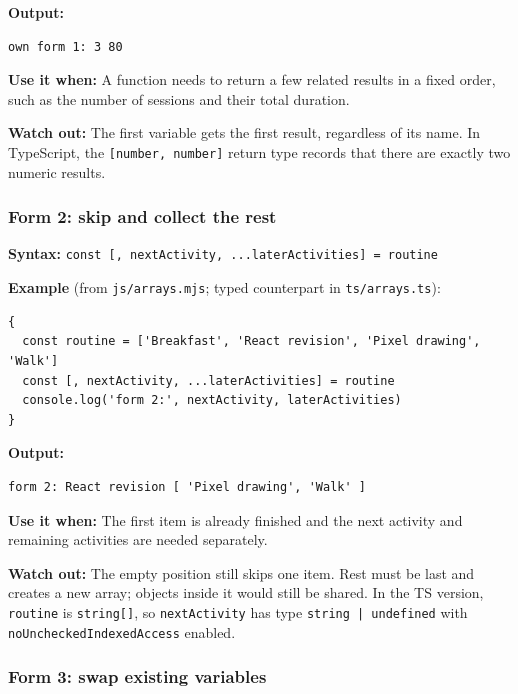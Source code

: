\documentclass[
  11pt,
]{article}
\newcommand{\passthrough}[1]{#1}
\begin{document}
\textbf{Output:}

\begin{lstlisting}
own form 1: 3 80
\end{lstlisting}

\textbf{Use it when:} A function needs to return a few related results
in a fixed order, such as the number of sessions and their total
duration.

\textbf{Watch out:} The first variable gets the first result, regardless
of its name. In TypeScript, the
\passthrough{\lstinline![number, number]!} return type records that
there are exactly two numeric results.

\subsubsection{Form 2: skip and collect the
rest}\label{form-2-skip-and-collect-the-rest}

\textbf{Syntax:}
\passthrough{\lstinline!const [, nextActivity, ...laterActivities] = routine!}

\textbf{Example} (from \passthrough{\lstinline!js/arrays.mjs!}; typed
counterpart in \passthrough{\lstinline!ts/arrays.ts!}):

\begin{lstlisting}
{
  const routine = ['Breakfast', 'React revision', 'Pixel drawing', 'Walk']
  const [, nextActivity, ...laterActivities] = routine
  console.log('form 2:', nextActivity, laterActivities)
}
\end{lstlisting}

\textbf{Output:}

\begin{lstlisting}
form 2: React revision [ 'Pixel drawing', 'Walk' ]
\end{lstlisting}

\textbf{Use it when:} The first item is already finished and the next
activity and remaining activities are needed separately.

\textbf{Watch out:} The empty position still skips one item. Rest must
be last and creates a new array; objects inside it would still be
shared. In the TS version, \passthrough{\lstinline!routine!} is
\passthrough{\lstinline!string[]!}, so
\passthrough{\lstinline!nextActivity!} has type
\passthrough{\lstinline!string | undefined!} with
\passthrough{\lstinline!noUncheckedIndexedAccess!} enabled.

\subsubsection{Form 3: swap existing
variables}\label{form-3-swap-existing-variables}
\end{document}
